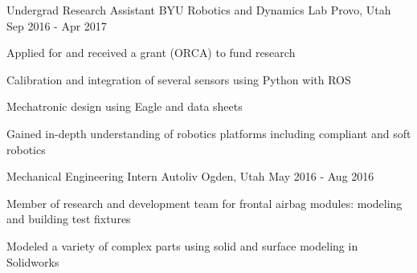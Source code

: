 \begin{cventries}
  \cventry
    {Undergrad Research Assistant} %
    {BYU Robotics and Dynamics Lab} %
    {Provo, Utah} %
    {Sep 2016 - Apr 2017} %
    {
      \begin{cvitems} %
        \item {Applied for and received a grant (ORCA) to fund research}
        \item {Calibration and integration of several sensors using Python with ROS}
        \item {Mechatronic design using Eagle and data sheets}
        \item {Gained in-depth understanding of robotics platforms including compliant and soft robotics}
      \end{cvitems}
    }


  \cventry
    {Mechanical Engineering Intern} %
    {Autoliv} %
    {Ogden, Utah} %
    {May 2016 - Aug 2016} %
    {
      \begin{cvitems} %
        \item {Member of research and development team for frontal airbag modules: modeling and building test fixtures}
        \item {Modeled a variety of complex parts using solid and surface modeling in Solidworks}
      \end{cvitems}
    }


\end{cventries}
